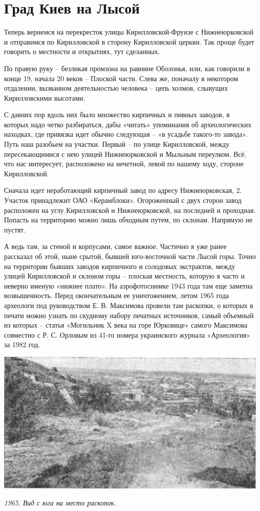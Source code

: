 \chapter{Град Киев на Лысой}

Теперь вернемся на перекресток улицы Кирилловской-Фрунзе с Нижнеюрковской и отправимся по Кирилловской в сторону Кирилловской церкви. Так проще будет говорить о местности и открытиях, тут сделанных.

По правую руку – безликая промзона на равнине Оболонья, или, как говорили в конце 19, начала 20 веков – Плоской части. Слева же, поначалу в некотором отдалении, вызванном деятельностью человека – цепь холмов, слывущих Кирилловскими высотами.

С давних пор вдоль них было множество кирпичных и пивных заводов, в которых надо четко разбираться, дабы «читать» упоминания об археологических находках, где привязка идет обычно следующая – «в усадьбе такого-то завода». Путь наш разобьем на участки. Первый – по улице Кирилловской, между пересекающимися с нею улицей Нижнеюрковской и Мыльным переулком. Всё, что нас интересует, расположено на нечетной, левой по нашему ходу, стороне Кирилловской.

Сначала идет неработающий кирпичный завод по адресу Нижнеюрковская, 2. Участок принадлежит ОАО «Керамблоки». Огороженный с двух сторон завод расположен на углу Кирилловской и Нижнеюрковской, на последней и проходная. Попасть на территорию можно лишь обходным путем, по склонам. Напрямую не пустят.

А ведь там, за стеной и корпусами, самое важное. Частично я уже ранее рассказал об этой, ныне срытой, бывшей юго-восточной части Лысой горы. Точно на территории бывших заводов кирпичного и солодовых экстрактов, между улицей Кирилловской и склоном горы – плоская местность, которую я часто и неверно именую «нижнее плато». На аэрофотоснимке 1943 года там еще заметна возвышенность. Перед окончательным ее уничтожением, летом 1965 года археологи под руководством Е. В. Максимова провели там раскопки, о которых в печати можно узнать по скудному набору печатных источников, самый объемный из которых – статья «Могильник X века на горе Юрковице» самого Максимова совместно с Р. С. Орловым из 41-го номера украинского журнала «Археология» за 1982 год.

\begin{center}
\includegraphics[width=\linewidth]{chast-kirvys/lys02/maxfoto.jpg}

\textit{1965. Вид с юга на место раскопок.}
\end{center}

